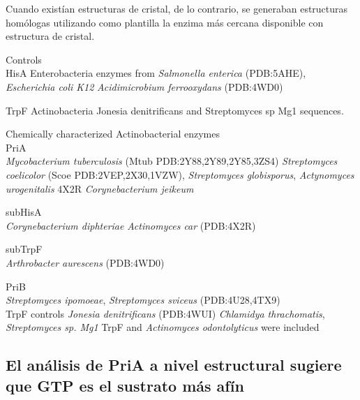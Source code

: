 \documentclass[12pt,twoside]{reedthesis}
\begin{document}
  Cuando existían estructuras de cristal, de lo contrario, se generaban
  estructuras homólogas utilizando como plantilla la enzima más cercana
  disponible con estructura de cristal.
  
  Controls\\
  HisA Enterobacteria enzymes from \emph{Salmonella enterica} (PDB:5AHE),
  \emph{Escherichia coli K12} \emph{Acidimicrobium ferrooxydans}
  (PDB:4WD0)
  
  TrpF Actinobacteria Jonesia denitrificans and Streptomyces sp Mg1
  sequences.
  
  Chemically characterized Actinobacterial enzymes\\
  PriA\\
  \emph{Mycobacterium tuberculosis} (Mtub PDB:2Y88,2Y89,2Y85,3ZS4)
  \emph{Streptomyces coelicolor} (Scoe PDB:2VEP,2X30,1VZW),
  \emph{Streptomyces globisporus}, \emph{Actynomyces urogenitalis} 4X2R
  \emph{Corynebacterium jeikeum}
  
  subHisA\\
  \emph{Corynebacterium diphteriae} \emph{Actinomyces car} (PDB:4X2R)
  
  subTrpF\\
  \emph{Arthrobacter aurescens} (PDB:4WD0)
  
  PriB\\
  \emph{Streptomyces ipomoeae}, \emph{Streptomyces sviceus}
  (PDB:4U28,4TX9)\\
  TrpF controls \emph{Jonesia denitrificans} (PDB:4WUI) \emph{Chlamidya
  thrachomatis}, \emph{Streptomyces sp. Mg1} TrpF and \emph{Actinomyces
  odontolyticus} were included
  
  \clearpage  
  
  \subsection{El análisis de PriA a nivel estructural sugiere que GTP es
  el sustrato más
  afín}\label{el-analisis-de-pria-a-nivel-estructural-sugiere-que-gtp-es-el-sustrato-mas-afin}
  
  \begin{Shaded}
  \begin{Highlighting}[]
  \StringTok{ }\NormalTok{(}\NormalTok{, } \NormalTok{,}\NormalTok{)}
   \CharTok{\textbackslash{}\textbackslash{}}\NormalTok{,} \NormalTok{)}
  \end{Highlighting}
  \end{Shaded}
  
\end{document}
